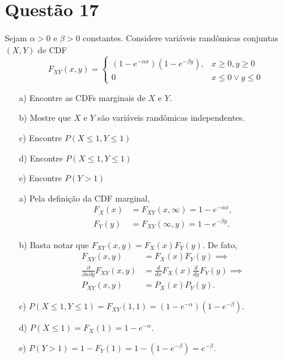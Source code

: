 \section{Questão 17}
Sejam $\alpha>0$ e $\beta>0$ constantes.
Considere variáveis randômicas conjuntas $(X, Y)$ de CDF
\begin{equation}
    F_{XY}(x, y) = 
    \begin{cases}
        (1 - e^{-\alpha x}) (1 - e^{-\beta y}), 
        & x\geq 0, y\geq 0
        \\
        0 & x\leq 0 \vee y\leq 0
    \end{cases}
\end{equation}
%
\begin{multicols}{2}
\begin{itemize}
    \item [a)] Encontre as CDFs marginais de $X$ e $Y$.
    \item [b)] Mostre que $X$ e $Y$ são variáveis randômicas independentes.
    \item [c)] Encontre $P(X\leq 1, Y\leq 1)$
    \item [d)] Encontre $P(X\leq 1, Y\leq 1)$
    \item [e)] Encontre $P(Y>1)$
\end{itemize}
\end{multicols}

\begin{respostas}
\begin{itemize}
    \item [a)] 
    Pela definição da CDF marginal,
    \begin{align}
        F_X(x) &= F_{XY}(x, \infty) = 1 - e^{-\alpha x}, \\
        F_Y(y) &= F_{XY}(\infty, y) = 1 - e^{-\beta y}.
    \end{align}
    
    \item [b)] 
    Basta notar que $F_{XY}(x,y) = F_X(x)F_Y(y)$.
    De fato,
    \begin{align}
        F_{XY}(x,y) &= F_X(x)F_Y(y) \implies \\
        \frac{\partial}{\partial x\partial y} F_{XY}(x,y)
        &=
        \frac{d}{dx} F_X(x)
        \frac{d}{dy} F_Y(y) \implies \\
        P_{XY}(x,y) &= P_X(x) P_Y(y).
    \end{align}
    
    \item [c)] 
    $P(X\leq 1, Y\leq 1) 
    = F_{XY}(1, 1) 
    = (1 - e^{-\alpha}) (1 - e^{-\beta})$.
    
    \item [d)] 
    $P(X\leq 1)
    = F_{X}(1)
    = 1 - e^{-\alpha}$.
    
    \item [e)] 
    $P(Y>1)
    = 1 - F_Y(1)
    = 1 - (1-e^{-\beta})
    = e^{-\beta}$.
\end{itemize}
\end{respostas}